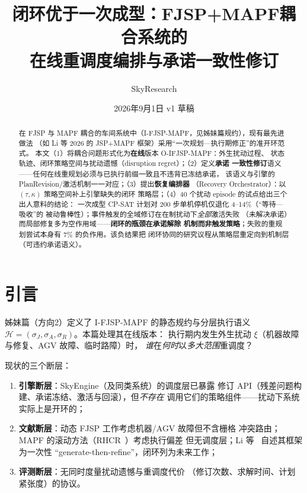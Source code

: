\documentclass[UTF8,12pt,a4paper]{ctexart}
\title{闭环优于一次成型：FJSP+MAPF耦合系统的\\在线重调度编排与承诺一致性修订}
\author{SkyResearch}
\date{2026年9月1日 \quad v1 草稿}
\begin{document}
\maketitle

\begin{abstract}
在 FJSP 与 MAPF 耦合的车间系统中（I-FJSP-MAPF，见姊妹篇规约），现有最先进做法
（如 Li 等 2026 的 JSP+MAPF 框架）采用``一次规划—执行期修正''的准开环范式。
本文（1）将耦合问题形式化为\textbf{在线}版本 O-IFJSP-MAPF：外生扰动过程、
状态轨迹、闭环策略空间与扰动遗憾（disruption regret）；（2）定义\textbf{承诺
一致性修订}语义——任何在线重规划必须与已执行前缀一致且不违背已冻结承诺，
该语义与引擎的 PlanRevision/激活机制一一对应；（3）提出\textbf{恢复编排器}
（Recovery Orchestrator）：以 $(\tau,\kappa)$ 策略空间补上引擎缺失的闭环
策略层；（4）40 个扰动 episode 的试点给出三个出人意料的结论：
一次成型 CP-SAT 计划对 200 步单机停机仅退化 4--14\%（``等待—吸收''的
被动鲁棒性）；事件触发的全域修订在在制扰动下\emph{全部}激活失败
（未解决承诺）而局部修复多为空作用域——\textbf{闭环的瓶颈在承诺解除
机制而非触发策略}；失败的重规划尝试本身有 7\% 的负作用。该负结果把
闭环协同的研究议程从策略层重定向到机制层（可违约承诺语义）。
\end{abstract}

\section{引言}

姊妹篇（方向2）定义了 I-FJSP-MAPF 的静态规约与分层执行语义
$\mathcal{H}=(\sigma_J,\sigma_A,\sigma_R)$。本篇处理其在线版本：
执行期内发生外生扰动 $\xi$（机器故障与修复、AGV 故障、临时路障）时，
\emph{谁}在\emph{何时}以\emph{多大范围}重调度？

现状的三个断层：
\begin{enumerate}
  \item \textbf{引擎断层}：SkyEngine（及同类系统）的调度层已暴露
    修订 API（残差问题构建、承诺冻结、激活与回滚），但\emph{不存在}
    调用它们的策略组件——扰动下系统实际上是开环的；
  \item \textbf{文献断层}：动态 FJSP 工作考虑机器/AGV 故障但不含栅格
    冲突路由；MAPF 的滚动方法（RHCR~\cite{li2021rhcr}）考虑执行偏差
    但无调度层；Li 等~\cite{li2026framework} 自述其框架为一次性
    ``generate-then-refine''，闭环列为未来工作；
  \item \textbf{评测断层}：无同时度量扰动遗憾与重调度代价
    （修订次数、求解时间、计划紧张度）的协议。
\end{enumerate}
\end{document}
